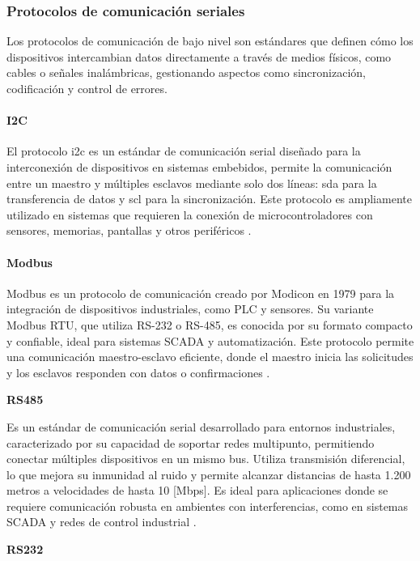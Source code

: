 \subsubsection{Protocolos de comunicación seriales}
Los protocolos de comunicación de bajo nivel son estándares que definen cómo los dispositivos intercambian datos directamente a través de medios físicos, como cables o señales inalámbricas, gestionando aspectos como sincronización, codificación y control de errores. 

\paragraph{I2C}
El protocolo \acrfull{i2c} es un estándar de comunicación serial diseñado para la interconexión de dispositivos en sistemas embebidos, permite la comunicación entre un maestro y múltiples esclavos mediante solo dos líneas: \acrshort{sda} para la transferencia de datos y \acrshort{scl} para la sincronización. Este protocolo es ampliamente utilizado en sistemas que requieren la conexión de microcontroladores con sensores, memorias, pantallas y otros periféricos \citep{i2c2012specification}.

\paragraph{Modbus}
Modbus es un protocolo de comunicación creado por Modicon en 1979 para la integración de dispositivos industriales, como PLC y sensores. Su variante Modbus RTU, que utiliza RS-232 o RS-485, es conocida por su formato compacto y confiable, ideal para sistemas SCADA y automatización. Este protocolo permite una comunicación maestro-esclavo eficiente, donde el maestro inicia las solicitudes y los esclavos responden con datos o confirmaciones \cite{modbus2012specification}.

\textbf{RS485}

Es un estándar de comunicación serial desarrollado para entornos industriales, caracterizado por su capacidad de soportar redes multipunto, permitiendo conectar múltiples dispositivos en un mismo bus. Utiliza transmisión diferencial, lo que mejora su inmunidad al ruido y permite alcanzar distancias de hasta 1.200 metros a velocidades de hasta 10 [Mbps]. Es ideal para aplicaciones donde se requiere comunicación robusta en ambientes con interferencias, como en sistemas SCADA y redes de control industrial \cite{rs485spec}.

\textbf{RS232}

